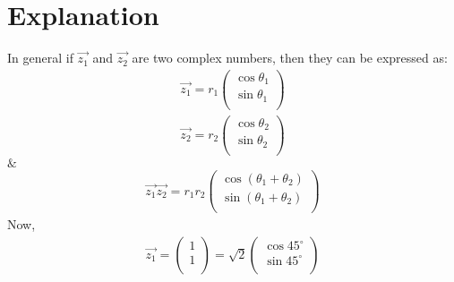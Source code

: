 \documentclass[journal,12pt,twocolumn]{IEEEtran}
\begin{document}
\section{Explanation}
%

In general if $\vec{z_1}$ and $\vec{z_2}$ are two complex numbers, then they can be expressed as:\\
\begin{equation}
\begin{aligned}
\vec{z_1} = r_1 \begin{pmatrix}
      \cos\theta_1 \\ 
      \sin\theta_1 \\
      \end{pmatrix}
\end{aligned}
\end{equation}
\begin{equation}
\begin{aligned}
\vec{z_2} = r_2 \begin{pmatrix}
      \cos\theta_2 \\ 
      \sin\theta_2 \\
      \end{pmatrix}
\end{aligned}
\end{equation}
$\&$
\begin{equation}
\begin{aligned}
\vec{z_1} \vec{z_2} = r_1r_2 \begin{pmatrix}
      \cos(\theta_1 + \theta_2) \\ 
      \sin(\theta_1 + \theta_2) \\
      \end{pmatrix}
\end{aligned}
\end{equation}
Now, \\

\begin{align}
\vec{z_1} = \begin{pmatrix}
      1 \\ 
      1 \\
      \end{pmatrix} = \sqrt{2}\begin{pmatrix}
      \cos45^{\circ} \\ 
      \sin45^{\circ} \\
      \end{pmatrix}
\end{align}
\end{document}

